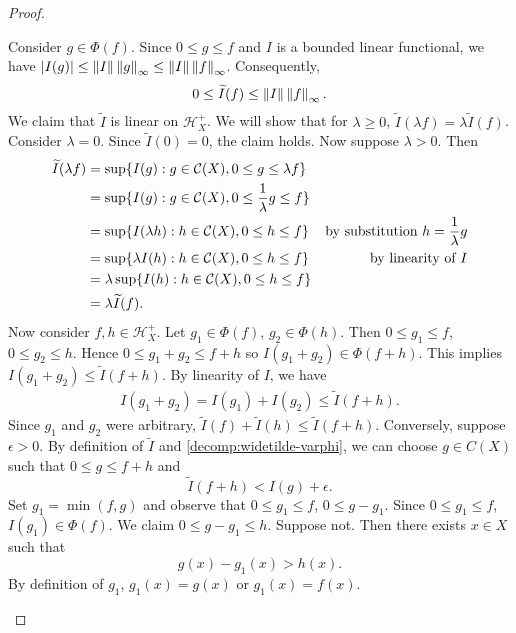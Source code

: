 \begin{proof}
\begin{step}
Consider $g \in \Phi(f)$. Since $0 \leq g \leq f$ and $I$ is a bounded linear functional, we have $| I(g) | \leq \left\lVert I \right\rVert \left\lVert g\right\rVert_{\infty} \leq \left\lVert I \right\rVert \left\lVert f\right\rVert_{\infty}$. Consequently, 
\begin{equation}
    \label{decomp:widetilde-varphi}
    0 \leq \widetilde{I}(f) \leq \left\lVert I \right\rVert \left\lVert f\right\rVert_{\infty}.
\end{equation}
We claim that $\widetilde{I}$ is linear on $\mathcal{H}_{X}^+$.
We will show that for $\lambda \geq 0$, $\widetilde{I}(\lambda f) = \lambda \widetilde{I}(f)$. Consider $\lambda = 0$. Since $\widetilde{I}(0) = 0$, the claim holds.
Now suppose $\lambda > 0$. Then
\begin{align*}
    \widetilde{I}(\lambda f) &= \sup \{ I(g) : g \in {\mathcal C}(X), 0 \leq g \leq \lambda f \} & \\
    &= \sup \{ I(g) : g \in {\mathcal C}(X), 0 \leq \frac{1}{\lambda} g \leq f \}  & \\
    &= \sup \{ I(\lambda h) : h \in {\mathcal C}(X), 0 \leq h \leq f \} & \text{by substitution $h = \frac{1}{\lambda} g$}\\
    &= \sup \{ \lambda I(h) : h \in {\mathcal C}(X), 0 \leq h \leq f \} & \text{by linearity of $I$} \\
    &= \lambda \sup \{ I(h) : h \in {\mathcal C}(X), 0 \leq h \leq f \} & \\
    &= \lambda \widetilde{I}(f).
\end{align*}
Now consider $f, h \in \mathcal{H}_{X}^+$. Let $g_1 \in \Phi(f)$, $g_2 \in \Phi(h)$.
Then $0 \leq g_1 \leq f$, $0 \leq g_2 \leq h$. Hence $0 \leq g_1 + g_2 \leq f + h$ so $I(g_1 + g_2) \in \Phi(f + h)$. This implies $I(g_1 + g_2) \leq \widetilde{I} (f + h)$.  
By linearity of $I$, we have
\begin{align*}
    I(g_1 + g_2) = I(g_1) + I(g_2) \leq \widetilde{I} (f + h).
\end{align*}
Since $g_1$ and $g_2$ were arbitrary, $ \widetilde{I} (f) + \widetilde{I} (h) \leq \widetilde{I} (f + h)$. Conversely, suppose $\epsilon > 0$. By definition of $\widetilde{I}$ and \ref{decomp:widetilde-varphi}, we can choose $g \in C(X)$ such that $0 \leq g \leq f + h$ and 
\begin{equation}
    \label{decomp:prop}
    \widetilde{I} (f + h) < I(g) + \epsilon.
\end{equation}
Set $g_1 = \min(f, g)$ and observe that $0 \leq g_1 \leq f$, $0 \leq g - g_1$. Since $0 \leq g_1 \leq f$, $I(g_1) \in \Phi(f)$.
We claim $0 \leq g - g_1 \leq h$. Suppose not. Then there exists $x \in X$ such that
\begin{equation}
    \label{decomp:contradict}
    g(x) - g_1(x) > h (x).
\end{equation}
By definition of $g_1$, $g_1(x) = g(x)$ or $g_1(x) = f(x)$.


\end{step}
\end{proof}
